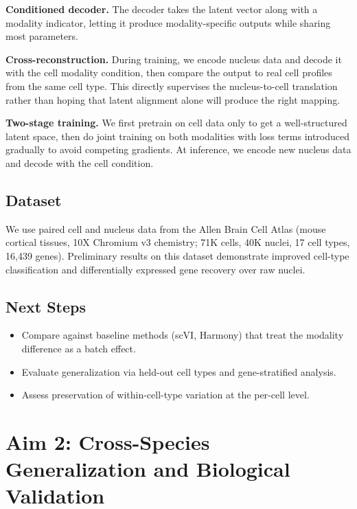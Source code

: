 \documentclass[11pt]{article}
\begin{document}
\textbf{Conditioned decoder.} The decoder takes the latent vector along with a modality indicator, letting it produce modality-specific outputs while sharing most parameters.

\textbf{Cross-reconstruction.} During training, we encode nucleus data and decode it with the cell modality condition, then compare the output to real cell profiles from the same cell type. This directly supervises the nucleus-to-cell translation rather than hoping that latent alignment alone will produce the right mapping.

\textbf{Two-stage training.} We first pretrain on cell data only to get a well-structured latent space, then do joint training on both modalities with loss terms introduced gradually to avoid competing gradients. At inference, we encode new nucleus data and decode with the cell condition.

\subsection*{Dataset}

We use paired cell and nucleus data from the Allen Brain Cell Atlas (mouse cortical tissues, 10X Chromium v3 chemistry; 71K cells, 40K nuclei, 17 cell types, 16,439 genes). Preliminary results on this dataset demonstrate improved cell-type classification and differentially expressed gene recovery over raw nuclei.

\subsection*{Next Steps}

\begin{itemize}[nosep]
    \item Compare against baseline methods (scVI, Harmony) that treat the modality difference as a batch effect.
    \item Evaluate generalization via held-out cell types and gene-stratified analysis.
    \item Assess preservation of within-cell-type variation at the per-cell level.
\end{itemize}

\newpage

\section*{Aim 2: Cross-Species Generalization and Biological Validation}
\end{document}
